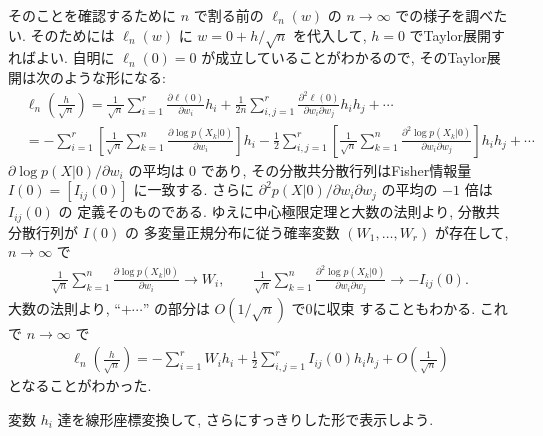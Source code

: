 \documentclass[12pt,twoside]{jarticle}
\renewcommand\d{\partial}
\theoremstyle{jplain}
\theoremstyle{jplain}
\theoremstyle{jplain}
\numberwithin{theorem}{section}
\numberwithin{equation}{section}
\numberwithin{figure}{section}
\numberwithin{table}{section}
\begin{document}
そのことを確認するために $n$ で割る前の $\ell_n(w)$ の $n\to\infty$
での様子を調べたい. そのためには $\ell_n(w)$
に $w=0+h/\sqrt{n}$ を代入して, $h=0$ でTaylor展開すればよい.
自明に $\ell_n(0)=0$ が成立していることがわかるので,
そのTaylor展開は次のような形になる:
\begin{align*}
  &
  \ell_n\left(\frac{h}{\sqrt{n}}\right)
  = \frac{1}{\sqrt{n}} \sum_{i=1}^r \frac{\d\ell(0)}{\d w_i}h_i
  + \frac{1}{2n}\sum_{i,j=1}^r\frac{\d^2\ell(0)}{\d w_i\d w_j}h_i h_j
  + \cdots
  \\ &
  = -\sum_{i=1}^r\left[
  \frac{1}{\sqrt{n}}\sum_{k=1}^n\frac{\d\log p(X_k|0)}{\d w_i}
  \right] h_i
  -\frac{1}{2}\sum_{i,j=1}^r\left[
  \frac{1}{\sqrt{n}}\sum_{k=1}^n\frac{\d^2\log p(X_k|0)}{\d w_i\d w_j}
  \right]h_i h_j
  + \cdots
\end{align*}
$\d\log p(X|0)/\d w_i$ の平均は $0$ であり,
その分散共分散行列はFisher情報量 $I(0)=[I_{ij}(0)]$ に一致する.
さらに $\d^2 p(X|0)/\d w_i\d w_j$ の平均の $-1$ 倍は $I_{ij}(0)$ の
定義そのものである.
ゆえに中心極限定理と大数の法則より, 分散共分散行列が $I(0)$ の
多変量正規分布に従う確率変数 $(W_1,\ldots,W_r)$ が存在して,
$n\to\infty$ で
\begin{align*}
  \frac{1}{\sqrt{n}}\sum_{k=1}^n\frac{\d\log p(X_k|0)}{\d w_i}
  \to W_i,
  \qquad
  \frac{1}{\sqrt{n}}\sum_{k=1}^n\frac{\d^2\log p(X_k|0)}{\d w_i\d w_j}
  \to -I_{ij}(0).
\end{align*}
大数の法則より, ``$+\cdots$'' の部分は $O(1/\sqrt{n})$ で0に収束
することもわかる. これで $n\to\infty$ で
\begin{align*}
  \ell_n\left(\frac{h}{\sqrt{n}}\right)
  = -\sum_{i=1}^r W_i h_i
  + \frac{1}{2}\sum_{i,j=1}^r I_{ij}(0) h_i h_j
  + O\left(\frac{1}{\sqrt{n}}\right)
\end{align*}
となることがわかった.

変数 $h_i$ 達を線形座標変換して, さらにすっきりした形で表示しよう.
\end{document}
